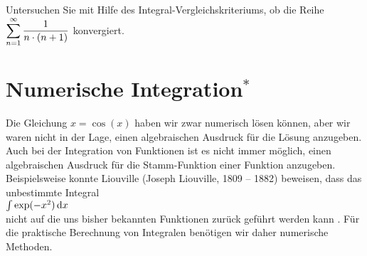 \exercise
Untersuchen Sie mit Hilfe des Integral-Vergleichskriteriums, ob die
Reihe 
\\[0.2cm]
\hspace*{1.3cm}
$\displaystyle \sum\limits_{n=1}^\infty \frac{1}{n\cdot (n+1)}$ 
\qquad
konvergiert.  \eox


\section{Numerische Integration$^*$}
Die Gleichung $x = \cos(x)$ haben wir zwar numerisch l\"osen k\"onnen, aber wir waren nicht in
der Lage, einen algebraischen Ausdruck f\"ur die L\"osung anzugeben.  Auch bei der Integration
von Funktionen ist es nicht immer m\"oglich, einen algebraischen Ausdruck f\"ur die
Stamm-Funktion einer Funktion anzugeben.  Beispielsweise konnte Liouville 
(Joseph Liouville, 1809 -- 1882) beweisen, dass das
unbestimmte Integral
\\[0.2cm]
\hspace*{1.3cm}
$\int \exp(-x^2)\, \textrm{d} x$
\\[0.2cm]
nicht auf die uns bisher bekannten Funktionen zur\"uck gef\"uhrt werden kann \cite{rosenlicht:72}.  F\"ur die
praktische Berechnung von Integralen ben\"otigen wir daher numerische Methoden.

